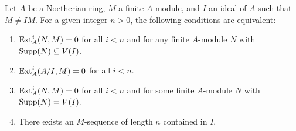 \begin{theorem}
    Let $A$ be a Noetherian ring, $M$ a finite $A$-module, and $I$ an ideal of $A$ such that $M\ne IM$. For a given integer $n > 0$, the following conditions are equivalent: 
    \begin{enumerate}[label=(\arabic*)]
        \item $\operatorname{Ext}^i_A(N, M) = 0$ for all $i < n$ and for any finite $A$-module $N$ with $\operatorname{Supp}(N)\subseteq V(I)$.
        \item $\operatorname{Ext}^i_A(A/I, M) = 0$ for all $i < n$. 
        \item $\operatorname{Ext}^i_A(N, M) = 0$ for all $i < n$ and for some finite $A$-module $N$ with $\operatorname{Supp}(N) = V(I)$. 
        \item There exists an $M$-sequence of length $n$ contained in $I$.
    \end{enumerate}
\end{theorem}
